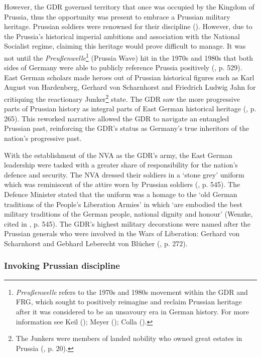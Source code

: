 However, the GDR governed territory that once was occupied by the Kingdom of Prussia, thus the opportunity was present to embrace a Prussian military heritage. Prussian soldiers were renowned for their discipline (\cite{jackman2004}). However, due to the Prussia’s historical imperial ambitions and association with the National Socialist regime, claiming this heritage would prove difficult to manage. It was not until the \textit{Preußenwelle}\footnote{\textit{Preußenwelle} refers to the 1970s and 1980s movement within the GDR and FRG, which sought to positively reimagine and reclaim Prussian heritage after it was considered to be an unsavoury era in German history. For more information see Keil (\citeyear{keil2016}); Meyer (\citeyear{meyer2018}); Colla (\citeyear{colla2019}).} (Prussia Wave) hit in the 1970s and 1980s that both sides of Germany were able to publicly reference Prussia positively (\cite{colla2019}, p. 529). East German scholars made heroes out of Prussian historical figures such as Karl August von Hardenberg, Gerhard von Scharnhorst and Friedrich Ludwig Jahn for critiquing the reactionary Junker\footnote{The Junkers were members of landed nobility who owned great estates in Prussia (\cite{taylor2001}, p. 20).} state. The GDR saw the more progressive parts of Prussian history as integral parts of East German historical heritage (\cite{keil2016}, p. 265). This reworked narrative allowed the GDR to navigate an entangled Prussian past, reinforcing the GDR’s status as Germany’s true inheritors of the nation’s progressive past.

With the establishment of the NVA as the GDR’s army, the East German leadership were tasked with a greater share of responsibility for the nation’s defence and security. The NVA dressed their soldiers in a ‘stone grey’ uniform which was reminiscent of the attire worn by Prussian soldiers (\cite{colla2019}, p. 545). The Defence Minister stated that the uniform was a homage to the ‘old German traditions of the People’s Liberation Armies’ in which ‘are embodied the best military traditions of the German people, national dignity and honour’ (Wenzke, cited in \cite{colla2019}, p. 545). The GDR’s highest military decorations were named after the Prussian generals who were involved in the Wars of Liberation: Gerhard von Scharnhorst and Gebhard Leberecht von Blücher (\cite{keil2016}, p. 272).

\subsubsection*{Invoking Prussian discipline}

